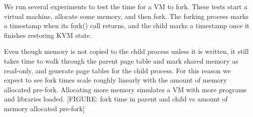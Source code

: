

 We run several experiments to test the time for a VM to fork. These tests start a virtual machine, allocate some memory, and then fork. The forking process marks a timestamp when its fork() call returns, and the child marks a timestamp once it finishes restoring KVM state.

Even though memory is not copied to the child process unless it is written, it still takes time to walk through the parent page table and mark shared memory as read-only, and generate page tables for the child process. For this reason we expect to see fork times scale roughly linearly with the amount of memory allocated pre-fork. Allocating more memory simulates a VM with more programs and libraries loaded. [FIGURE: fork time in parent and child vs amount of memory allocated pre-fork]

